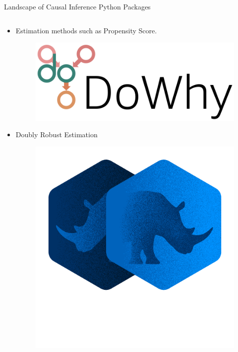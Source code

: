 \documentclass{beamer}
\begin{document}
\begin{frame}{Landscape of Causal Inference Python Packages}
	\begin{columns}
		\begin{column}{0.5 \textwidth}
			\begin{itemize}
				\item Estimation methods such as Propensity Score.
					\begin{figure}
						\includegraphics[scale=0.2]{imgs/dowhy.png}
					\end{figure}
				\item Doubly Robust Estimation
					\begin{figure}
						\includegraphics[scale=0.1]{imgs/doubleml.png}
					\end{figure}

\end{itemize}
\end{column}
\end{columns}
\end{frame}
\end{document}
